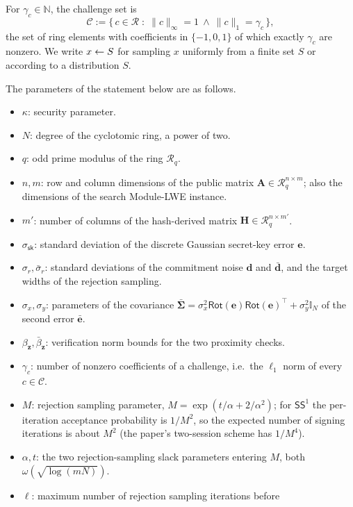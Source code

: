 \documentclass{aicr-conjecture}
\newcommand{\NN}{\mathbb{N}}
\newcommand{\II}{\mathbb{I}}
\newcommand{\cR}{\mathcal{R}}
\newcommand{\cC}{\mathcal{C}}
\newcommand{\Rot}{\mathsf{Rot}}
\newcommand{\SSone}{\mathsf{SS}^1}
\newcommand{\ssk}{\sigma_{\mathsf{sk}}}
\begin{document}
For $\gamma_c \in \NN$, the challenge set is
\[
  \cC := \{\, c \in \cR \;:\;
    \|c\|_\infty = 1 \ \wedge\ \|c\|_1 = \gamma_c \,\},
\]
the set of ring elements with coefficients in $\{-1,0,1\}$ of which
exactly $\gamma_c$ are nonzero. We write $x \leftarrow S$ for sampling $x$
uniformly from a finite set $S$ or according to a distribution $S$.

The parameters of the statement below are as follows.

\begin{itemize}[leftmargin=1.2em]
  \item $\kappa$: security parameter.
  \item $N$: degree of the cyclotomic ring, a power of two.
  \item $q$: odd prime modulus of the ring $\cR_q$.
  \item $n, m$: row and column dimensions of the public matrix
  $\mathbf{A} \in \cR_q^{n\times m}$; also the dimensions of the search
  Module-LWE instance.
  \item $m'$: number of columns of the hash-derived matrix
  $\mathbf{H} \in \cR_q^{n\times m'}$.
  \item $\ssk$: standard deviation of the discrete Gaussian
  secret-key error $\mathbf{e}$.
  \item $\sigma_r, \bar\sigma_r$: standard deviations of the commitment
  noise $\mathbf{d}$ and $\bar{\mathbf{d}}$, and the target widths of
  the rejection sampling.
  \item $\sigma_x, \sigma_y$: parameters of the covariance
  $\bar{\boldsymbol\Sigma} =
   \sigma_x^2\Rot(\mathbf{e})\Rot(\mathbf{e})^\top + \sigma_y^2\II_N$
  of the second error $\bar{\mathbf{e}}$.
  \item $\beta_{\mathbf{z}}, \bar\beta_{\mathbf{z}}$: verification norm
  bounds for the two proximity checks.
  \item $\gamma_c$: number of nonzero coefficients of a challenge,
  i.e.\ the $\ell_1$ norm of every $c \in \cC$.
  \item $M$: rejection sampling parameter,
  $M = \exp(t/\alpha + 2/\alpha^2)$; for $\SSone$ the per-iteration
  acceptance probability is $1/M^2$, so the expected number of signing
  iterations is about $M^2$ (the paper's two-session scheme has
  $1/M^4$).
  \item $\alpha, t$: the two rejection-sampling slack parameters
  entering $M$, both $\omega(\sqrt{\log(mN)})$.
  \item $\ell$: maximum number of rejection sampling iterations before

\end{itemize}
\end{document}
